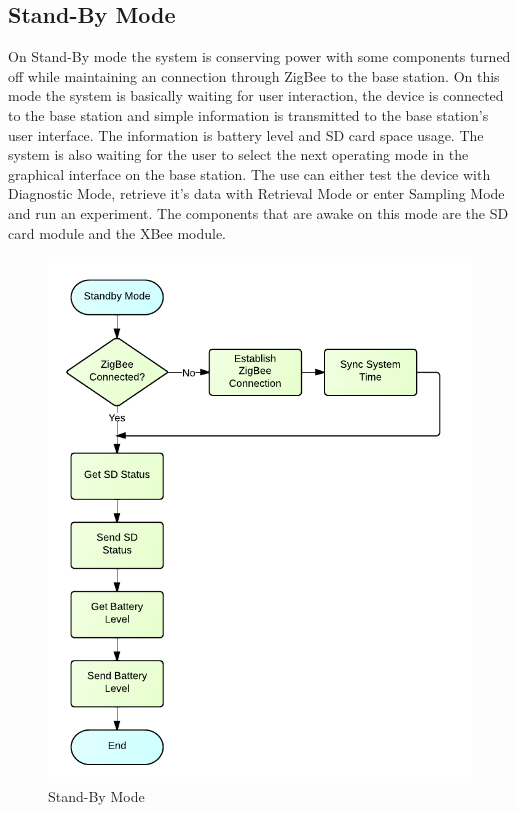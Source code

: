 \subsection{Stand-By Mode}
On Stand-By mode the system is conserving power with some components turned off while maintaining an connection through ZigBee to the base station. On this mode the system is basically waiting for user interaction, the device is connected to the base station and simple information is transmitted to the base station's user interface. The information is battery level and SD card space usage. The system is also waiting for the user to select the next operating mode in the graphical interface on the base station. The use can either test the device with Diagnostic Mode, retrieve it's data with Retrieval Mode or enter Sampling Mode and run an experiment. The components that are awake on this mode are the SD card module and the XBee module.
\begin{figure}[H]
	\centering
	\includegraphics[scale=1.0]{img/StandByMode}
	\caption{Stand-By Mode \label{fig:standByMode}}
\end{figure}

